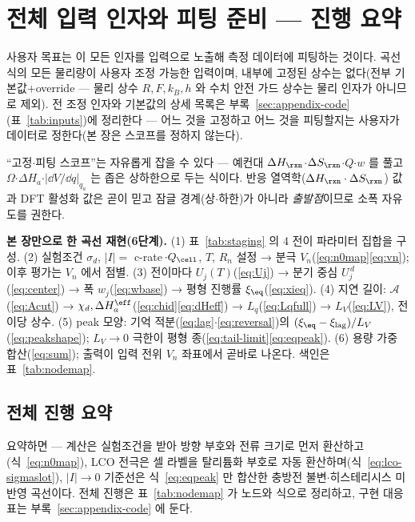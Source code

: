 \section{전체 입력 인자와 피팅 준비 --- 진행 요약}\label{sec:inputs}
사용자 목표는 이 모든 인자를 입력으로 노출해 측정 데이터에 피팅하는 것이다. 곡선식의 모든 물리량이 사용자
조정 가능한 입력이며, 내부에 고정된 상수는 없다(전부 기본값$+$override --- 물리 상수 $R,F,k_B,h$ 와
수치 안전 가드 상수는 물리 인자가 아니므로 제외). 전 조정 인자와 기본값의 상세
목록은 부록~\ref{sec:appendix-code}(표~\ref{tab:inputs})에 정리한다 --- 어느 것을 고정하고 어느 것을
피팅할지는 사용자가 데이터로 정한다(본 장은 스코프를 정하지 않는다).

``고정$\cdot$피팅 스코프''는 자유롭게 잡을 수 있다 --- 예컨대
$\Delta H_\rxn$$\cdot$$\Delta S_\rxn$$\cdot$$Q$$\cdot$$w$ 를 풀고 $\Omega$$\cdot$$\Delta H_a$$\cdot$$|\dd V/\dd q|_{q_a}$
는 좁은 상하한으로 두는 식이다. 반응 열역학($\Delta H_\rxn\cdot\Delta S_\rxn$) 값과 DFT 활성화 값은 곧이
믿고 잠글 경계(상$\cdot$하한)가 아니라 \emph{출발점}이므로 소폭 자유도를 권한다.

\begin{keybox}
\textbf{본 장만으로 한 곡선 재현(6단계).}
(1) 표~\ref{tab:staging} 의 4 전이 파라미터 집합을 구성.
(2) 실험조건 $\sigma_d$, $|I|=$ c-rate$\,\cdot Q_\cell$, $T$, $R_n$ 설정 → 분극 $V_n$(\eqref{eq:n0map}\eqref{eq:vn}); 이후 평가는 $V_n$ 에서 점별.
(3) 전이마다 $U_j(T)$(\eqref{eq:Uj}) → 분기 중심 $U_j^{\,d}$(\eqref{eq:center}) → 폭 $w_j$(\eqref{eq:wbase}) → 평형 진행률 $\xi_\eq$(\eqref{eq:xieq}).
(4) 지연 길이: $\mathcal A$(\eqref{eq:Acut}) → $\chi_d,\Delta H_a^\eff$(\eqref{eq:chid}\eqref{eq:dHeff}) → $L_q$(\eqref{eq:Lqfull}) → $L_V$(\eqref{eq:LV}), 전이당 상수.
(5) peak 모양: 기억 적분(\eqref{eq:lag}$\cdot$\eqref{eq:reversal})의 $(\xi_\eq-\xi_\mathrm{lag})/L_V$(\eqref{eq:peakshape}); $L_V\to0$ 극한이 평형 종(\eqref{eq:tail-limit}\eqref{eq:eqpeak}).
(6) 용량 가중 합산(\eqref{eq:sum}); 출력이 입력 전위 $V_n$ 좌표에서 곧바로 나온다. 색인은 표~\ref{tab:nodemap}.
\end{keybox}

\subsection{전체 진행 요약}\label{sec:facade}
요약하면 --- 계산은 실험조건을 받아 방향 부호와 전류 크기로 먼저 환산하고(식~\eqref{eq:n0map}),
LCO 전극은 셀 라벨을 탈리튬화 부호로 자동 환산하며(식~\eqref{eq:lco-sigmaslot}), $|I|\to0$ 기준선은
식~\eqref{eq:eqpeak} 만 합산한 충방전 불변$\cdot$히스테리시스 미반영 곡선이다. 전체 진행은
표~\ref{tab:nodemap} 가 노드와 식으로 정리하고, 구현 대응표는
부록~\ref{sec:appendix-code} 에 둔다.


